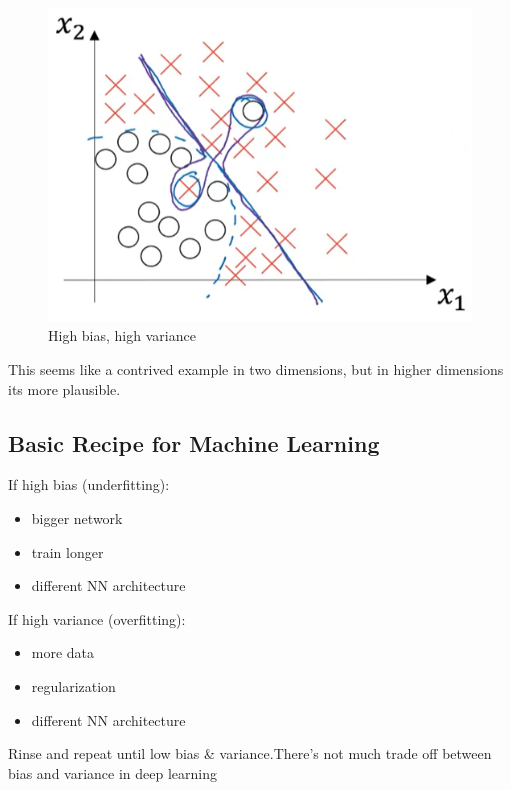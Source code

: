 \begin{figure}[htbp] %
    \begin{minipage}[t]{0.3\textwidth}
        \includegraphics[width=\linewidth, valign=t]{images/high_b_v.png}
        \caption*{High bias, high variance}
        \label{fig:high_b_v}
    \end{minipage}
\end{figure}

This seems like a contrived example in two dimensions, but in higher dimensions its more plausible.

\subsection*{Basic Recipe for Machine Learning}

If high bias (underfitting):
\begin{itemize}
    \item bigger network
    \item train longer
    \item different NN architecture
\end{itemize}

If high variance (overfitting):
\begin{itemize}
    \item more data
    \item regularization
    \item different NN architecture 
\end{itemize}
    
Rinse and repeat until low bias \& variance.There's not much trade off between bias and variance in deep learning

